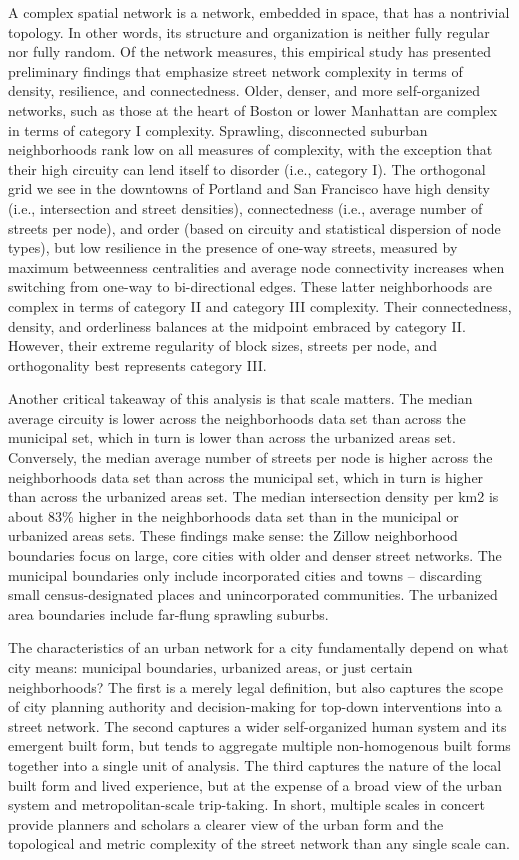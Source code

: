 \documentclass[Afour,sageh,times]{sage/sagej}
\begin{document}
A complex spatial network is a network, embedded in space, that has a nontrivial topology. In other words, its structure and organization is neither fully regular nor fully random. Of the network measures, this empirical study has presented preliminary findings that emphasize street network complexity in terms of density, resilience, and connectedness. Older, denser, and more self-organized networks, such as those at the heart of Boston or lower Manhattan are complex in terms of category I complexity. Sprawling, disconnected suburban neighborhoods rank low on all measures of complexity, with the exception that their high circuity can lend itself to disorder (i.e., category I). The orthogonal grid we see in the downtowns of Portland and San Francisco have high density (i.e., intersection and street densities), connectedness (i.e., average number of streets per node), and order (based on circuity and statistical dispersion of node types), but low resilience in the presence of one-way streets, measured by maximum betweenness centralities and average node connectivity increases when switching from one-way to bi-directional edges. These latter neighborhoods are complex in terms of category II and category III complexity. Their connectedness, density, and orderliness balances at the midpoint embraced by category II. However, their extreme regularity of block sizes, streets per node, and orthogonality best represents category III.

Another critical takeaway of this analysis is that scale matters. The median average circuity is lower across the neighborhoods data set than across the municipal set, which in turn is lower than across the urbanized areas set. Conversely, the median average number of streets per node is higher across the neighborhoods data set than across the municipal set, which in turn is higher than across the urbanized areas set. The median intersection density per km2 is about 83\% higher in the neighborhoods data set than in the municipal or urbanized areas sets. These findings make sense: the Zillow neighborhood boundaries focus on large, core cities with older and denser street networks. The municipal boundaries only include incorporated cities and towns – discarding small census-designated places and unincorporated communities. The urbanized area boundaries include far-flung sprawling suburbs.

The characteristics of an urban network for a city fundamentally depend on what city means: municipal boundaries, urbanized areas, or just certain neighborhoods? The first is a merely legal definition, but also captures the scope of city planning authority and decision-making for top-down interventions into a street network. The second captures a wider self-organized human system and its emergent built form, but tends to aggregate multiple non-homogenous built forms together into a single unit of analysis. The third captures the nature of the local built form and lived experience, but at the expense of a broad view of the urban system and metropolitan-scale trip-taking. In short, multiple scales in concert provide planners and scholars a clearer view of the urban form and the topological and metric complexity of the street network than any single scale can.
\end{document}
